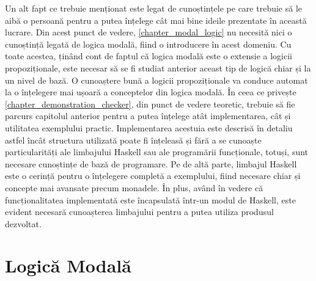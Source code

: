 \documentclass[12pt, openany]{book}
\newcommand{\mysectionreference}[1]{\autoref{#1}}
\begin{document}
            \par{}
                Un alt fapt ce trebuie menționat este legat de cunoștințele pe care trebuie să le aibă o persoană 
                pentru a putea înțelege cât mai bine ideile prezentate în această lucrare. Din acest punct de vedere, 
                \mysectionreference{chapter_modal_logic} nu necesită nici o cunoștință legată de logica modală, fiind o
                introducere în acest domeniu. Cu toate acestea, ținând cont de faptul că logica modală este o extensie a 
                logicii propoziționale, este necesar să se fi studiat anterior aceast tip de logică chiar și la un nivel 
                de bază. O cunoaștere bună a logicii propoziționale va conduce automat la o înțelegere mai ușoară a 
                conceptelor din logica modală. În ceea ce privește \mysectionreference{chapter_demonstration_checker}, 
                din punct de vedere teoretic, trebuie să fie parcurs capitolul anterior pentru a putea înțelege atât 
                implementarea, cât și utilitatea exemplului practic. Implementarea acestuia este descrisă în detaliu 
                astfel încât structura utilizată poate fi înțeleasă și fără a se cunoaște particularități ale limbajului 
                Haskell sau ale programării funcționale, totuși, sunt necesare cunoștințe de bază de programare. Pe de 
                altă parte, limbajul Haskell este o cerință pentru o înțelegere completă a exemplului, fiind necesare 
                chiar și concepte mai avansate precum monadele. În plus, având în vedere că funcționalitatea 
                implementată este încapsulată într-un modul de Haskell, este evident necesară cunoașterea limbajului 
                pentru a putea utiliza produsul dezvoltat.

    \chapter{Logică Modală} %
    \label{chapter_modal_logic}
\end{document}
